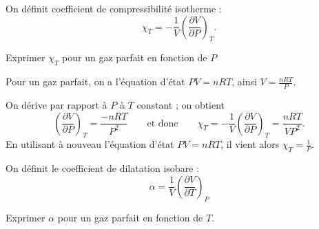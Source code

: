 \hauteurLargeurCadreReponse		{9mm}{3.5cm}
\typeEntrainement				{} %
\initialisationEntrainement

On définit coefficient de compressibilité isotherme : 
\[
\chi_T=-\frac{1}{V}\left(\frac{\partial V}{\partial P}\right)_T.
\]
\minusBigskip\minusMedskip

\debutEntrainement




\begin{enonce}
	 Exprimer $\chi_T$ pour un gaz parfait en fonction de $P$
\end{enonce}


\begin{corrige}
Pour un gaz parfait, on a l'équation d'état $PV=nRT$, ainsi $V=\frac{nRT}{P}$. 

On dérive par rapport à $P$ à $T$ constant ; on obtient
\[
\left(\frac{\partial V}{\partial P}\right)_T=\frac{-nRT}{P^2}
\qquad\text{et donc}\qquad
\chi_T=-\frac{1}{V}\left(\frac{\partial V}{\partial P}\right)_T=\frac{nRT}{VP^2}.
\]
En utilisant à nouveau l'équation d'état $PV=nRT$, il vient alors $\chi_T=\frac{1}{P}$.
\end{corrige}


\bigskip
On définit le coefficient de dilatation isobare : 
\[
\alpha=\frac{1}{V}\left(\frac{\partial V}{\partial T}\right)_P
\]
\minusBigskip\minusMedskip


\begin{enonce}
	 Exprimer $\alpha$ pour un gaz parfait en fonction de $T$.
\end{enonce}

